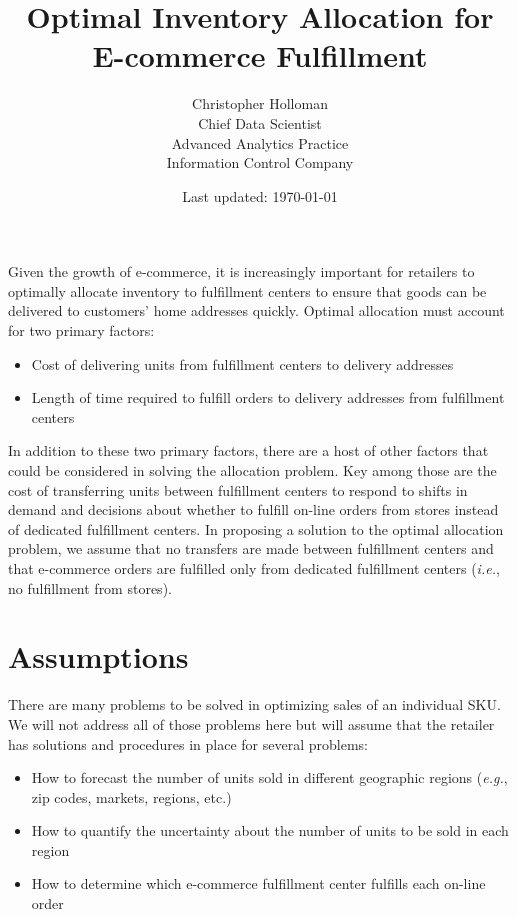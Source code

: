 \documentclass[11pt, oneside]{article}   	%
\title{Optimal Inventory Allocation for E-commerce Fulfillment}
\author{Christopher Holloman \\ Chief Data Scientist \\ Advanced Analytics Practice \\ Information Control Company}
\date{Last updated: \today}							%
\begin{document}
\maketitle

Given the growth of e-commerce, it is increasingly important for retailers to optimally allocate inventory to fulfillment centers to ensure that goods can be delivered to customers' home addresses quickly. Optimal allocation must account for two primary factors:

\begin{itemize}
\item Cost of delivering units from fulfillment centers to delivery addresses
\item Length of time required to fulfill orders to delivery addresses from fulfillment centers
\end{itemize}

In addition to these two primary factors, there are a host of other factors that could be considered in solving the allocation problem.  Key among those are the cost of transferring units between fulfillment centers to respond to shifts in demand and decisions about whether to fulfill on-line orders from stores instead of dedicated fulfillment centers.  In proposing a solution to the optimal allocation problem, we assume that no transfers are made between fulfillment centers and that e-commerce orders are fulfilled only from dedicated fulfillment centers (\emph{i.e.}, no fulfillment from stores).

\section{Assumptions}

There are many problems to be solved in optimizing sales of an individual SKU.  We will not address all of those problems here but will assume that the retailer has solutions and procedures in place for several problems:

\begin{itemize}
\item How to forecast the number of units sold in different geographic regions (\emph{e.g.}, zip codes, markets, regions, etc.)
\item How to quantify the uncertainty about the number of units to be sold in each region
\item How to determine which e-commerce fulfillment center fulfills each on-line order
\end{itemize}
\end{document}

